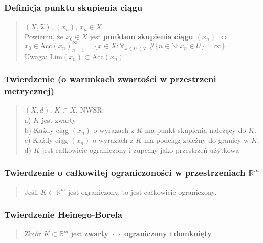 \documentclass[10pt,a4paper]{article}
\begin{document}
{
\subsubsection*{Definicja punktu skupienia ciągu}
    \begin{quote}
    $(X, \mathfrak{T})$, $(x_n)$, $x_n \in X$. \\
    Powiemu, że $x_0 \in X$ jest \textbf{punktem skupienia ciągu $(x_n)$} $\iff$ \\
    $x_0 \in \mathrm{Acc}(x_n)_{n=1}^\infty = \{x \in X: \forall_{x \in U \in \mathfrak{T}} \; \#\{n \in \mathbb{N} : x_n \in U\} = \infty\}$ \\
    Uwaga: $\mathrm{Lim}(x_n) \subset \mathrm{Acc}(x_n)$
    \end{quote}

    \subsubsection*{Twierdzenie (o warunkach zwartości w przestrzeni metrycznej)}
    \begin{quote}
    $(X, d)$, $K \subset X$. NWSR: \\
    a) $K$ jest zwarty \\
    b) Każdy ciąg $(x_n)$ o wyrazach z $K$ ma punkt skupienia należący do $K$. \\
    c) Każdy ciąg $(x_n)$ o wyrazach z $K$ ma podciąg zbieżny do granicy w $K$. \\
    d) $K$ jest całkowicie ograniczony i zupełny jako przestrzeń użytkowa
    \end{quote}

    \subsubsection*{Twierdzenie o całkowitej ograniczoności w przestrzeniach $\mathbb{R}^m$}
    \begin{quote}
    Jeśli $K \subset \mathbb{R}^m$ jest ograniczony, to jest całkowicie ograniczony.
    \end{quote}

    \subsubsection*{Twierdzenie Heinego-Borela}
    \begin{quote}
    Zbiór $K \subset \mathbb{R}^m$ jest \textbf{zwarty} $\iff$ \textbf{ograniczony} i \textbf{domknięty}
    \end{quote}

}
\end{document}
